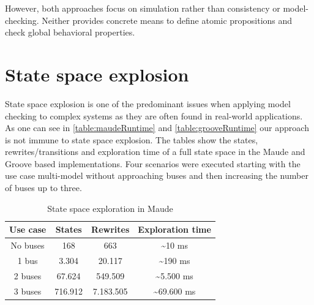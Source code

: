 \documentclass{jot}
\begin{document}
However, both approaches focus on simulation rather than consistency or model-checking.
Neither provides concrete means to define atomic propositions and check global behavioral properties.

\section{State space explosion}

State space explosion is one of the predominant issues when applying model checking to complex systems as they are often found in real-world applications.
As one can see in \autoref{table:maudeRuntime} and \autoref{table:grooveRuntime} our approach is not immune to state space explosion.
The tables show the states, rewrites/transitions and exploration time of a full state space in the Maude and Groove based implementations.
Four scenarios were executed starting with the use case multi-model without approaching buses and then increasing the number of buses up to three.

\begin{table}
\centering
\begin{tabular}{|c || c | c | c |}
 \hline
 Use case & States & Rewrites & Exploration time \\
 \hline\hline
 No buses & 168 & 663 & \textasciitilde 10 ms \\
 \hline
 1 bus & 3.304 & 20.117 & \textasciitilde 190 ms \\
 \hline
 2 buses & 67.624 & 549.509 & \textasciitilde 5.500 ms \\
 \hline
 3 buses & 716.912 & 7.183.505 & \textasciitilde 69.600 ms \\
 \hline
\end{tabular}
\caption[State space exploration in Maude]{State space exploration in Maude\footnotemark}
\label{table:maudeRuntime}
\end{table}

\end{document}
